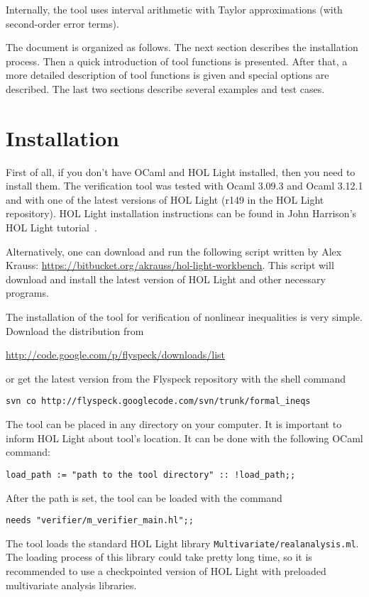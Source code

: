 \documentclass[a4paper]{article}
\begin{document}
Internally, the tool uses interval arithmetic with Taylor approximations (with second-order error terms).

The document is organized as follows. The next section describes the installation process. Then a quick introduction of tool functions is presented. After that, a more detailed description of tool functions is given and special options are described. The last two sections describe several examples and test cases.


\section{Installation}
First of all, if you don't have OCaml and HOL Light installed, then you need to install them. The verification tool was tested with Ocaml 3.09.3 and Ocaml 3.12.1 and with one of the latest versions of HOL Light (r149 in the HOL Light repository).  HOL Light installation instructions can be found in John Harrison's HOL Light tutorial~\cite{HOL-tutorial}.

Alternatively, one can download and run the following script written by Alex Krauss: \url{https://bitbucket.org/akrauss/hol-light-workbench}. This script will download and install the latest version of HOL Light and other necessary programs.

The installation of the tool for verification of nonlinear inequalities is very simple. Download the distribution from

\vspace{-5pt}
\url{http://code.google.com/p/flyspeck/downloads/list}

\vspace{-5pt}
or get the latest version from the Flyspeck repository with the shell command

\vspace{-5pt}
\verb|svn co http://flyspeck.googlecode.com/svn/trunk/formal_ineqs|


The tool can be placed in any directory on your computer. It is important to inform HOL Light about tool's location. It can be done with the following OCaml command:

\verb|load_path := "path to the tool directory" :: !load_path;;|

After the path is set, the tool can be loaded with the command

\verb|needs "verifier/m_verifier_main.hl";;|

The tool loads the standard HOL Light library \verb|Multivariate/realanalysis.ml|. The loading process of this library could take pretty long time, so it is recommended to use a checkpointed version of HOL Light with preloaded multivariate analysis libraries.
\end{document}
